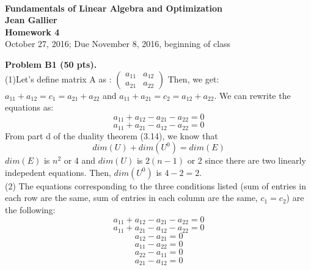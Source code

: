 \documentclass[12pt]{article}
\begin{document}
\begin{center}
\\
\vspace{1cm}
{\Large\bf Fundamentals of Linear Algebra and Optimization\\
Jean Gallier \\
\vspace{0.5cm}
Homework 4}\\[10pt]
October 27, 2016; Due November 8, 2016, beginning of class\\
\end{center}


\vspace {0.25cm}\noindent
{\bf Problem B1 (50 pts).} \\
\medskip
(1)Let's define matrix A as : $\begin{pmatrix}
a_{11} & a_{12} \\a_{21} & a_{22}
\end{pmatrix}$ Then, we get: $a_{11} + a_{12} = c_1 = a_{21} + a_{22}$ and $a_{11} + a_{21} = c_2 = a_{12} + a_{22}$. We can rewrite the equations as:
\begin{equation}
a_{11} + a_{12} - a_{21} -a_{22} = 0
\end{equation}
\begin{equation}
a_{11} + a_{21} - a_{12} - a_{22} = 0
\end{equation}
From part d of the duality theorem (3.14), we know that $$dim(U) + dim(U^0) = dim(E)$$
$dim(E)$ is $n^2$ or 4 and $dim(U)$ is $2(n-1)$ or 2 since there are two linearly indepedent equations. Then, $dim(U^0)$ is $4 - 2 = 2$.  \\
\medskip
(2)
The equations corresponding to the three conditions listed (sum of entries in each row are the same, sum of entries in each column are the same, $c_1 = c_2$) are the following:
\begin{equation}
a_{11} + a_{12} - a_{21} - a_{22} = 0
\end{equation}
\begin{equation}
a_{11} + a_{21} - a_{12} - a_{22} = 0
\end{equation}
\begin{equation}
a_{12} - a_{21}  = 0
\end{equation}
\begin{equation}
a_{11} - a_{22} = 0
\end{equation}
\begin{equation}
a_{22} - a_{11} = 0
\end{equation}
\begin{equation}
a_{21} - a_{12} = 0
\end{equation}
\end{document}
